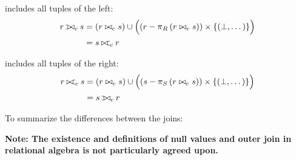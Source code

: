 \begin{multicols}{2}
\begin{CheatsheetEntryFrame}
        \textit{} includes all tuples of the left:
        \begin{align*}
            r \relleftouterjoin_c s &=
                (r \bowtie_c s)
                \cup \parens*{\vphantom{\frac{x}{x}}
                    \parens*{r - \relproject_R{(r \bowtie_c s)}}
                    \times \braces*{(\relnullvalue, \dots)}
                } \\
            &=
                s \relrightouterjoin_c r
        \end{align*}

        \textit{} includes all tuples of the right:
        \begin{align*}
            r \relrightouterjoin_c s &=
                (r \bowtie_c s)
                \cup \parens*{\vphantom{\frac{x}{x}}
                    \parens*{s - \relproject_S{(r \bowtie_c s)}}
                    \times \braces*{(\relnullvalue, \dots)}
                } \\
            &=
                s \relleftouterjoin_c r
        \end{align*}

        To summarize the differences between the joins:

        \vspace{1.0ex}

        \vspace{\TextExtraSkip}
        \textbf{\color{mycontrastred}
            Note: The existence and definitions of null values and outer join in relational algebra is not particularly agreed upon.
        }


\end{CheatsheetEntryFrame}
\end{multicols}
